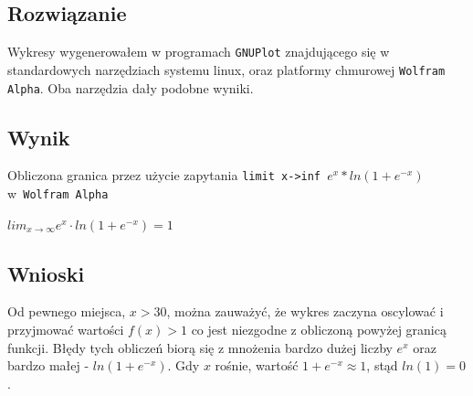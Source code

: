 \documentclass{article}
\begin{document}
        \subsection{Rozwiązanie}
            Wykresy wygenerowałem w programach \texttt{GNUPlot} znajdującego się w standardowych narzędziach systemu linux, oraz platformy chmurowej \texttt{Wolfram Alpha}. Oba narzędzia dały podobne wyniki.
        \subsection{Wynik}
            Obliczona granica przez użycie zapytania
            \texttt{limit x->inf $e^x * ln(1 + e^{-x})$} \\ w\texttt{ Wolfram Alpha}
            \begin{center}
                $lim_{x\rightarrow\infty}e^x\cdot ln(1 + e^{-x}) = 1$
            \end{center}
        \subsection{Wnioski}
            Od pewnego miejsca, $x > 30$, można zauważyć, że wykres zaczyna oscylować i przyjmować wartości $f(x) > 1$ co jest niezgodne z obliczoną powyżej granicą funkcji. Błędy tych obliczeń biorą się z mnożenia bardzo dużej liczby $e^x$ oraz bardzo małej - $ln(1+e^{-x})$. Gdy $x$ rośnie, wartość $1 + e^{-x} \approx 1$, stąd $ln(1) = 0$.
\end{document}
